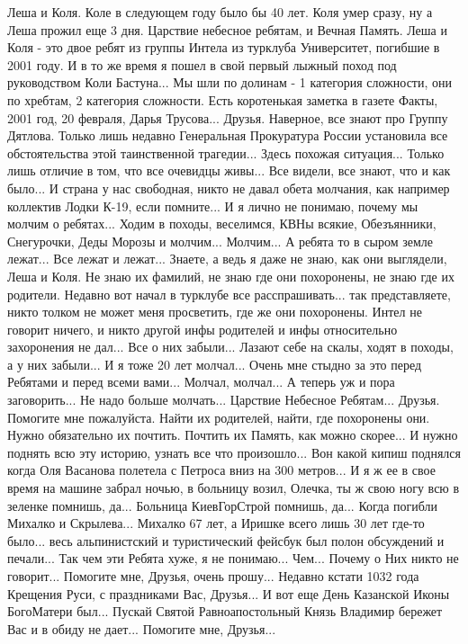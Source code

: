 Леша и Коля. Коле в следующем году было бы 40 лет. Коля умер сразу, ну а Леша
прожил еще 3 дня. Царствие небесное ребятам, и Вечная Память. Леша и
Коля - это двое ребят из группы Интела из турклуба Университет, погибшие в 2001
году. И в то же время я пошел в свой первый лыжный поход под руководством Коли
Бастуна... Мы шли по долинам - 1 категория сложности, они по хребтам, 2
категория сложности. Есть коротенькая заметка в газете Факты, 2001 год, 20
февраля, Дарья Трусова... Друзья. Наверное, все знают про Группу Дятлова.
Только лишь недавно Генеральная Прокуратура России установила все
обстоятельства этой таинственной трагедии... Здесь похожая ситуация... Только
лишь отличие в том, что все очевидцы живы... Все видели, все знают, что и как
было... И страна у нас свободная, никто не давал обета молчания, как например
коллектив Лодки К-19, если помните... И я лично не понимаю, почему мы молчим о
ребятах... Ходим в походы, веселимся, КВНы всякие, Обезъянники, Снегурочки,
Деды Морозы и молчим... Молчим... А ребята то в сыром земле лежат... Все лежат
и лежат... Знаете, а ведь я даже не знаю, как они выглядели, Леша и Коля. Не
знаю их фамилий, не знаю где они похоронены, не знаю где их родители. Недавно
вот начал в турклубе все расспрашивать... так представляете, никто толком не
может меня просветить, где же они похоронены. Интел не говорит ничего, и никто
другой инфы
родителей и инфы относительно захоронения не дал... Все о них забыли... Лазают
себе на скалы, ходят в походы, а у них забыли... И я тоже 20 лет молчал...
Очень мне стыдно за это перед Ребятами и перед всеми вами... Молчал, молчал...
А теперь уж и пора заговорить... Не надо больше молчать... Царствие Небесное
Ребятам...
Друзья. Помогите мне пожалуйста. Найти их родителей, найти, где похоронены они.
Нужно обязательно их почтить. Почтить их Память, как можно скорее... И нужно
поднять всю эту историю, узнать все что произошло...
Вон какой кипиш поднялся когда Оля Васанова полетела с Петроса вниз на 300
метров... И я ж ее в свое время на машине забрал ночью, в больницу возил,
Олечка, ты ж свою ногу всю в зеленке помнишь, да... Больница КиевГорСтрой
помнишь, да... Когда погибли Михалко и Скрылева... Михалко 67 лет, а Иришке
всего лишь 30 лет где-то было... весь альпинистский и
туристический фейсбук был полон обсуждений и печали... Так чем эти Ребята хуже,
я не понимаю... Чем... Почему о Них никто не говорит... Помогите мне, Друзья,
очень прошу...
Недавно кстати 1032 года Крещения Руси, с праздниками Вас, Друзья... И
вот еще День Казанской Иконы БогоМатери был... Пускай Святой Равноапостольный
Князь Владимир бережет Вас и в обиду не дает...
Помогите мне, Друзья...  

